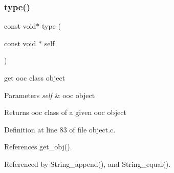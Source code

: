 \subsubsection{\texorpdfstring{type()}{type()}}
{\footnotesize\ttfamily const void$\ast$ type (\begin{DoxyParamCaption}\item[{const void $\ast$}]{self }\end{DoxyParamCaption})}



get ooc class object 


\begin{DoxyParams}{Parameters}
{\em self} & ooc object \\
\hline
\end{DoxyParams}
\begin{DoxyReturn}{Returns}
ooc class of a given ooc object 
\end{DoxyReturn}


Definition at line 83 of file object.\+c.



References get\+\_\+obj().



Referenced by String\+\_\+append(), and String\+\_\+equal().


